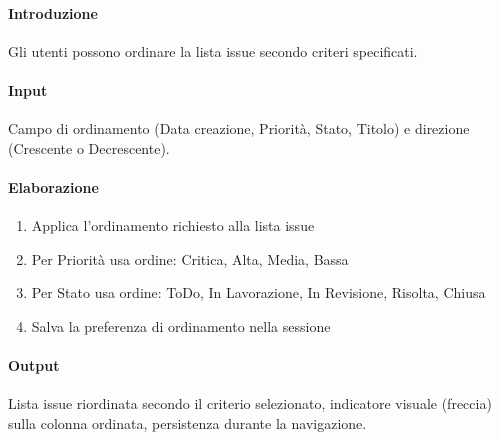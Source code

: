 \begin{reqbox}[title=REQ-FUN-16: Ordina Issue]
\label{subsubsec:req-ordina-issue}

\paragraph{Introduzione}
Gli utenti possono ordinare la lista issue secondo criteri specificati.

\paragraph{Input}
Campo di ordinamento (Data creazione, Priorità, Stato, Titolo) e direzione (Crescente o Decrescente).

\paragraph{Elaborazione}
\begin{enumerate}[leftmargin=1.1em]
\item Applica l'ordinamento richiesto alla lista issue
\item Per Priorità usa ordine: Critica, Alta, Media, Bassa
\item Per Stato usa ordine: ToDo, In Lavorazione, In Revisione, Risolta, Chiusa
\item Salva la preferenza di ordinamento nella sessione
\end{enumerate}

\paragraph{Output}
Lista issue riordinata secondo il criterio selezionato, indicatore visuale (freccia) sulla colonna ordinata, persistenza durante la navigazione.

\end{reqbox}

\vspace{0.5cm}

\newpage


